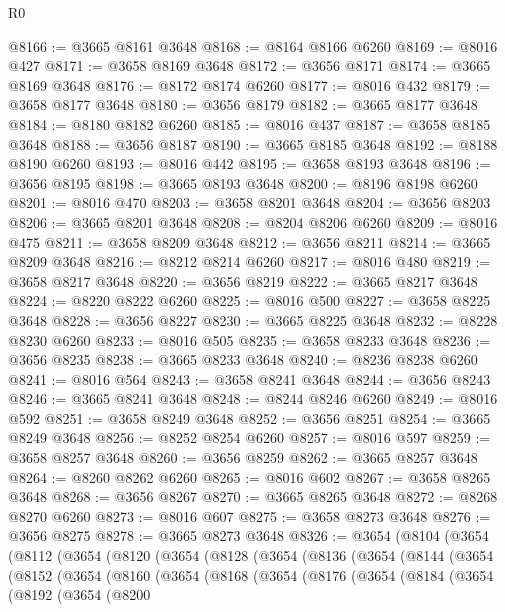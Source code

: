\begin{lexlean}{R0}
\begin{coremodule}
@8166 := @3665 @8161 @3648
@8168 := @8164 @8166 @6260
@8169 := @8016 @427
@8171 := @3658 @8169 @3648
@8172 := @3656 @8171
@8174 := @3665 @8169 @3648
@8176 := @8172 @8174 @6260
@8177 := @8016 @432
@8179 := @3658 @8177 @3648
@8180 := @3656 @8179
@8182 := @3665 @8177 @3648
@8184 := @8180 @8182 @6260
@8185 := @8016 @437
@8187 := @3658 @8185 @3648
@8188 := @3656 @8187
@8190 := @3665 @8185 @3648
@8192 := @8188 @8190 @6260
@8193 := @8016 @442
@8195 := @3658 @8193 @3648
@8196 := @3656 @8195
@8198 := @3665 @8193 @3648
@8200 := @8196 @8198 @6260
@8201 := @8016 @470
@8203 := @3658 @8201 @3648
@8204 := @3656 @8203
@8206 := @3665 @8201 @3648
@8208 := @8204 @8206 @6260
@8209 := @8016 @475
@8211 := @3658 @8209 @3648
@8212 := @3656 @8211
@8214 := @3665 @8209 @3648
@8216 := @8212 @8214 @6260
@8217 := @8016 @480
@8219 := @3658 @8217 @3648
@8220 := @3656 @8219
@8222 := @3665 @8217 @3648
@8224 := @8220 @8222 @6260
@8225 := @8016 @500
@8227 := @3658 @8225 @3648
@8228 := @3656 @8227
@8230 := @3665 @8225 @3648
@8232 := @8228 @8230 @6260
@8233 := @8016 @505
@8235 := @3658 @8233 @3648
@8236 := @3656 @8235
@8238 := @3665 @8233 @3648
@8240 := @8236 @8238 @6260
@8241 := @8016 @564
@8243 := @3658 @8241 @3648
@8244 := @3656 @8243
@8246 := @3665 @8241 @3648
@8248 := @8244 @8246 @6260
@8249 := @8016 @592
@8251 := @3658 @8249 @3648
@8252 := @3656 @8251
@8254 := @3665 @8249 @3648
@8256 := @8252 @8254 @6260
@8257 := @8016 @597
@8259 := @3658 @8257 @3648
@8260 := @3656 @8259
@8262 := @3665 @8257 @3648
@8264 := @8260 @8262 @6260
@8265 := @8016 @602
@8267 := @3658 @8265 @3648
@8268 := @3656 @8267
@8270 := @3665 @8265 @3648
@8272 := @8268 @8270 @6260
@8273 := @8016 @607
@8275 := @3658 @8273 @3648
@8276 := @3656 @8275
@8278 := @3665 @8273 @3648
@8326 := @3654
    (@8104
      (@3654
        (@8112
          (@3654
            (@8120
              (@3654
                (@8128
                  (@3654
                    (@8136
                      (@3654
                        (@8144
                          (@3654
                            (@8152
                              (@3654
                                (@8160
                                  (@3654
                                    (@8168
                                      (@3654
                                        (@8176
                                          (@3654
                                            (@8184
                                              (@3654
                                                (@8192
                                                  (@3654
                                                    (@8200

\end{coremodule}
\end{lexlean}
